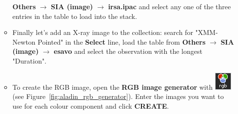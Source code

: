 \documentclass [a4paper, 12pt]{article}
\begin{document}
\begin{itemize}
\begin{itemize}
         \textbf{Others} $\rightarrow$ \textbf{SIA (image)} $\rightarrow$
         \textbf{irsa.ipac} and select any one of the three entries in the
         table to load into the stack.
         \item Finally let's add an X-ray image to the collection: search for
         "XMM-Newton Pointed" in the \textbf{Select} line, load the table from
         \textbf{Others} $\rightarrow$ \textbf{SIA (image)} $\rightarrow$
         \textbf{esavo} and select the observation with the longest "Duration".
         \item To create the RGB image, open the \textbf{RGB image generator}
         with \includegraphics[width=0.04
         \textwidth]{../images/aladin_button_rgb.png} (see
         Figure~\ref{fig:aladin_rgb_generator}). Enter the images you want to
         use for each colour component and click \textbf{CREATE}.
     \end{itemize}


\end{itemize}
\end{document}
